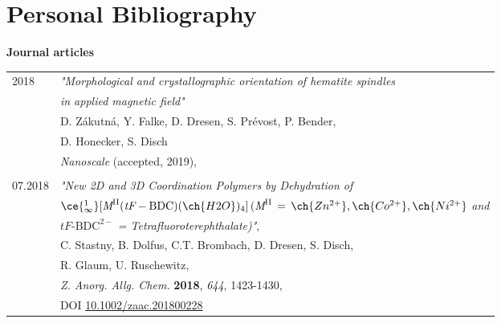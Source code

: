 \documentclass[\main/dresen_thesis.tex]{subfiles}
\begin{document}
	\section*{Personal Bibliography}

	\noindent \textbf{Journal articles}
	\begin{table}[H]
			\begin{tabular}{p{2cm}l}
				2018 			& \textit{"Morphological and crystallographic orientation of hematite spindles}\\
										  &	\textit{in applied magnetic field"}\\
											& D. Zákutná, Y. Falke, D. Dresen, S. Prévost, P. Bender,\\
											& D. Honecker, S. Disch\\
											& \textit{Nanoscale} (accepted, 2019),\\ \\
				07.2018 			& \textit{"New 2D and 3D Coordination Polymers by Dehydration of}\\
											& $\ce{^{1}_{\infty}} [ \textit{M}^{\mathrm{II}} (\textit{tF}‐\mathrm{BDC})(\ch{H2O})_4]\, (\textit{M}^{\mathrm{II}}\,=\, \ch{Zn^{2+}}, \ch{Co^{2+}}, \ch{Ni^{2+}}$ \textit{and}\\
											& $\textit{tF}‐\mathrm{BDC}^{2-}$ \textit{= Tetrafluoroterephthalate)"},\\
											& C. Stastny, B. Dolfus, C.T. Brombach, D. Dresen, S. Disch,\\
											& R. Glaum, U. Ruschewitz,\\
											& \textit{Z. Anorg. Allg. Chem.} \textbf{2018}, \textit{644}, 1423-1430,\\
											& DOI \href{https://doi.org/10.1002/zaac.201800228}{10.1002/zaac.201800228}
			\end{tabular}
	\end{table}

	\vspace{\baselineskip}
\end{document}
